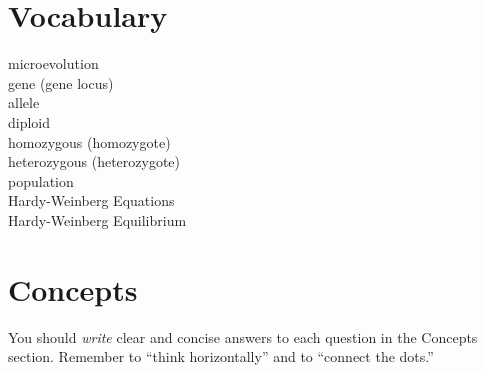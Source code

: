 \documentclass[letterpaper]{tufte-handout}
\begin{document}
\section{Vocabulary}
\vspace{-1\baselineskip}
\begin{multicols}{2}
microevolution\\
gene (gene locus)\\
allele\\
diploid\\
homozygous (homozygote)\\
heterozygous (heterozygote)\\
population\\
Hardy-Weinberg Equations\\
Hardy-Weinberg Equilibrium\\
\end{multicols}

\section{Concepts}

You should \emph{write} clear and concise answers to each question in the Concepts section.  Remember to ``think horizontally'' and to ``connect the dots.'' 
\end{document}
